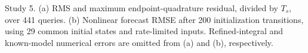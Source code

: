 \caption{Study 5. (a) RMS and maximum endpoint-quadrature residual,
divided by $T_s$, over 441 queries. (b) Nonlinear forecast RMSE after
200 initialization transitions, using 29 common initial states and
rate-limited inputs. Refined-integral and known-model numerical errors
are omitted from (a) and (b), respectively.}
